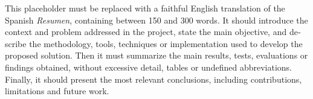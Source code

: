 
\begin{otherlanguage}{english}

This placeholder must be replaced with a faithful English translation of the Spanish \emph{Resumen}, containing between 150 and 300 words. It should introduce the context and problem addressed in the project, state the main objective, and describe the methodology, tools, techniques or implementation used to develop the proposed solution. Then it must summarize the main results, tests, evaluations or findings obtained, without excessive detail, tables or undefined abbreviations. Finally, it should present the most relevant conclusions, including contributions, limitations and future work.

\end{otherlanguage}
